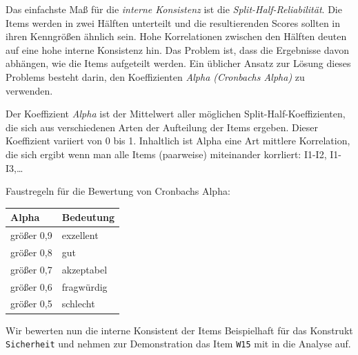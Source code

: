 \documentclass[12pt,ngerman,]{book}
\theoremstyle{definition}
\theoremstyle{definition}
\theoremstyle{remark}
\begin{document}
Das einfachste Maß für die \emph{interne
Konsistenz} ist die
\emph{Split-Half-Reliabilität}. Die Items
werden in zwei Hälften unterteilt und die resultierenden Scores sollten
in ihren Kenngrößen ähnlich sein. Hohe Korrelationen zwischen den
Hälften deuten auf eine hohe interne Konsistenz hin. Das Problem ist,
dass die Ergebnisse davon abhängen, wie die Items aufgeteilt werden. Ein
üblicher Ansatz zur Lösung dieses Problems besteht darin, den
Koeffizienten \emph{Alpha (Cronbachs Alpha)} zu
verwenden.

Der Koeffizient \emph{Alpha} ist der Mittelwert aller möglichen
Split-Half-Koeffizienten, die sich aus verschiedenen Arten der
Aufteilung der Items ergeben. Dieser Koeffizient variiert von 0 bis 1.
Inhaltlich ist Alpha eine Art mittlere Korrelation, die sich ergibt wenn
man alle Items (paarweise) miteinander korrliert: I1-I2, I1-I3,\ldots{}

Faustregeln für die Bewertung von Cronbachs Alpha:

\begin{longtable}[]{@{}ll@{}}
\toprule
Alpha & Bedeutung\tabularnewline
\midrule
\endhead
größer 0,9 & exzellent\tabularnewline
größer 0,8 & gut\tabularnewline
größer 0,7 & akzeptabel\tabularnewline
größer 0,6 & fragwürdig\tabularnewline
größer 0,5 & schlecht\tabularnewline
\bottomrule
\end{longtable}

Wir bewerten nun die interne Konsistent der Items Beispielhaft für das
Konstrukt \texttt{Sicherheit} und nehmen zur Demonstration das Item
\texttt{W15} mit in die Analyse auf.
\end{document}
